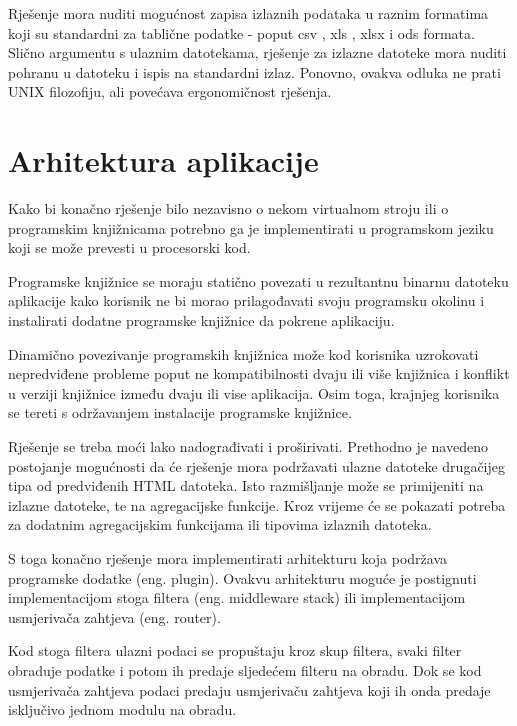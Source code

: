 \documentclass[times, utf8, zavrsni]{fer}
\begin{document}
Rješenje mora nuditi mogućnost zapisa izlaznih podataka u raznim formatima
koji su standardni za tablične podatke - poput csv \cite{csv_documentation},
xls \cite{xls_documentation}, xlsx \cite{xlsx_documentation} i
ods \cite{ods_documentation} formata.
Slično argumentu s ulaznim datotekama, rješenje za izlazne datoteke mora nuditi
pohranu u datoteku i ispis na standardni izlaz. Ponovno, ovakva odluka ne
prati UNIX filozofiju, ali povećava ergonomičnost rješenja.

\section{Arhitektura aplikacije}

Kako bi konačno rješenje bilo nezavisno o nekom virtualnom stroju ili o
programskim knjižnicama potrebno ga je implementirati u programskom jeziku
koji se može prevesti u procesorski kod.

Programske knjižnice se moraju statično povezati u rezultantnu binarnu
datoteku aplikacije kako korisnik ne bi morao prilagođavati svoju programsku
okolinu i instalirati dodatne programske knjižnice da pokrene aplikaciju.

Dinamično povezivanje programskih knjižnica može kod korisnika uzrokovati
nepredviđene probleme poput ne kompatibilnosti dvaju ili više knjižnica i
konflikt u verziji knjižnice između dvaju ili vise aplikacija. Osim toga,
krajnjeg korisnika se tereti s održavanjem instalacije programske knjižnice.

Rješenje se treba moći lako nadograđivati i proširivati. Prethodno je navedeno
postojanje mogućnosti da će rješenje mora podržavati ulazne datoteke
drugačijeg tipa od predviđenih HTML datoteka. Isto razmišljanje može se
primijeniti na izlazne datoteke, te na agregacijske funkcije. Kroz vrijeme će
se pokazati potreba za dodatnim agregacijskim funkcijama ili tipovima izlaznih
datoteka.

S toga konačno rješenje mora implementirati arhitekturu koja
podržava programske dodatke \cite{plugin_architecture_wiki}
(eng. plugin). Ovakvu arhitekturu moguće je
postignuti implementacijom stoga filtera \cite{middleware_wiki}
(eng. middleware stack) ili
implementacijom usmjerivača zahtjeva \cite{router_arhitecture_ieee}
(eng. router).

Kod stoga filtera ulazni podaci se propuštaju kroz skup filtera, svaki filter
obraduje podatke i potom ih predaje sljedećem filteru na obradu. Dok se kod
usmjerivača zahtjeva podaci predaju usmjerivaču zahtjeva koji ih onda predaje
isključivo
jednom modulu na obradu.
\end{document}
